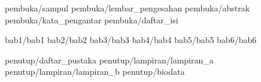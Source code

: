 \documentclass[a5paper, twoside, 11pt, listof=nochaptergap] {book}
\begin{document}
	
	\pagestyle {normal}
	
	\frontmatter
		 {pembuka/sampul}
		 {pembuka/lembar_pengesahan}
		 {pembuka/abstrak}
		 {pembuka/kata_pengantar}
		 {pembuka/daftar_isi}
	
	\mainmatter
		 {bab1/bab1} \cleardoublepage
		 {bab2/bab2} \cleardoublepage
		 {bab3/bab3} \cleardoublepage
		 {bab4/bab4} \cleardoublepage
		 {bab5/bab5} \cleardoublepage
		 {bab6/bab6} \cleardoublepage
	
	\backmatter
		 {penutup/daftar_pustaka}
		 {penutup/lampiran/lampiran_a}
		 {penutup/lampiran/lampiran_b}
		 {penutup/biodata}
\end{document}
